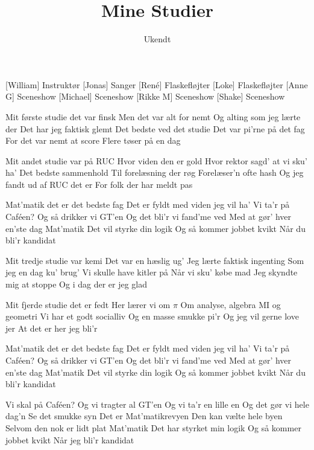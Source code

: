 \documentclass[a4paper,11pt]{article}
\title{Mine Studier}
\author{Ukendt}
\begin{document}
\maketitle

\begin{roles}
[William] Instruktør
[Jonas] Sanger
[René] Flaskefløjter
[Loke] Flaskefløjter
[Anne G] Sceneshow
[Michael] Sceneshow
[Rikke M] Sceneshow
[Shake] Sceneshow
\end{roles}

\begin{song}
 Mit første studie det var finsk
Men det var alt for nemt
Og alting som jeg lærte der
Det har jeg faktisk glemt
Det bedste ved det studie
Det var pi'rne på det fag
For det var nemt at score
Flere tøser på en dag

 Mit andet studie var på RUC
Hvor viden den er gold
Hvor rektor sagd' at vi sku' ha'
Det bedste sammenhold
Til forelæsning der røg
Forelæser'n ofte hash
Og jeg fandt ud af RUC det er
For folk der har meldt pas

 Mat'matik det er det bedste fag
Det er fyldt med viden jeg vil ha'
Vi ta'r på Caféen?
Og så drikker vi GT'en
Og det bli'r vi fand'me ved
Med at gør' hver en'ste dag
Mat'matik
Det vil styrke din logik
Og så kommer jobbet kvikt
Når du bli'r kandidat

 Mit tredje studie var kemi
Det var en hæslig ug'
Jeg lærte faktisk ingenting
Som jeg en dag ku' brug'
Vi skulle have kitler på
Når vi sku' købe mad
Jeg skyndte mig at stoppe
Og i dag der er jeg glad

 Mit fjerde studie det er fedt
Her lærer vi om $\pi$
Om analyse, algebra
MI og geometri
Vi har et godt socialliv
Og en masse smukke pi'r
Og jeg vil gerne love jer
At det er her jeg bli'r

 Mat'matik det er det bedste fag
Det er fyldt med viden jeg vil ha'
Vi ta'r på Caféen?
Og så drikker vi GT'en
Og det bli'r vi fand'me ved
Med at gør' hver en'ste dag
Mat'matik
Det vil styrke din logik
Og så kommer jobbet kvikt
Når du bli'r kandidat

 Vi skal på Caféen?
Og vi tragter al GT'en
Og vi ta'r en lille en
Og det gør vi hele dag'n
Se det smukke syn
Det er Mat'matikrevyen
Den kan vælte hele byen
Selvom den nok er lidt plat
Mat'matik
Det har styrket min logik
Og så kommer jobbet kvikt
Når jeg bli'r kandidat
\end{song}
\end{document}

